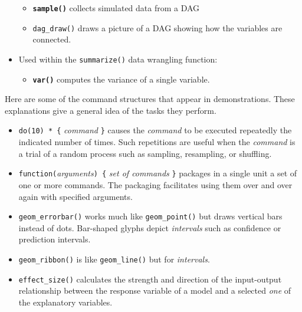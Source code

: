 \documentclass[
  letterpaper,
  DIV=11,
  numbers=noendperiod,
  oneside]{scrreprt}
\providecommand{\tightlist}{%
  \setlength{\itemsep}{0pt}\setlength{\parskip}{0pt}}\usepackage{longtable,booktabs,array}
\begin{document}
\begin{itemize}
  \begin{itemize}
  \tightlist
  \item
    \textbf{\texttt{sample()}} collects simulated data from a DAG
  \item
    \texttt{dag\_draw()} draws a picture of a DAG showing how the
    variables are connected.
  \end{itemize}
\item
  Used within the \texttt{summarize()} data wrangling function:

  \begin{itemize}
  \tightlist
  \item
    \textbf{\texttt{var()}} computes the variance of a single variable.
  \end{itemize}
\end{itemize}

\begin{tcolorbox}[enhanced jigsaw, colbacktitle=quarto-callout-warning-color!10!white, breakable, opacitybacktitle=0.6, colback=white, left=2mm, arc=.35mm, colframe=quarto-callout-warning-color-frame, coltitle=black, toprule=.15mm, opacityback=0, leftrule=.75mm, bottomtitle=1mm, toptitle=1mm, titlerule=0mm, title=\textcolor{quarto-callout-warning-color}{\faExclamationTriangle}\hspace{0.5em}{Demonstration}, rightrule=.15mm, bottomrule=.15mm]

Here are some of the command structures that appear in demonstrations.
These explanations give a general idea of the tasks they perform.

\begin{itemize}
\tightlist
\item
  \texttt{do(10)\ *\ \{} \emph{command} \texttt{\}} causes the
  \emph{command} to be executed repeatedly the indicated number of
  times. Such repetitions are useful when the \emph{command} is a trial
  of a random process such as sampling, resampling, or shuffling.
\item
  \texttt{function(}\emph{arguments}\texttt{)\ \{} \emph{set of
  commands} \texttt{\}} packages in a single unit a set of one or more
  commands. The packaging facilitates using them over and over again
  with specified arguments.
\item
  \texttt{geom\_errorbar()} works much like \texttt{geom\_point()} but
  draws vertical bars instead of dots. Bar-shaped glyphs depict
  \emph{intervals} such as confidence or prediction intervals.
\item
  \texttt{geom\_ribbon()} is like \texttt{geom\_line()} but for
  \emph{intervals}.
\item
  \texttt{effect\_size()} calculates the strength and direction of the
  input-output relationship between the response variable of a model and
  a selected \emph{one} of the explanatory variables.
\end{itemize}

\end{tcolorbox}
\end{document}
